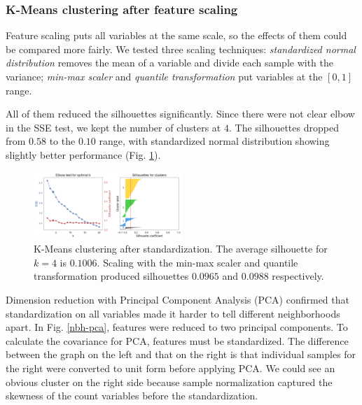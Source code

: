 \documentclass[compsoc]{IEEEtran}
\let\MYoriglatexcaption\caption
\renewcommand{\caption}[2][\relax]{\MYoriglatexcaption[#2]{#2}}
\begin{document}
\subsubsection{K-Means clustering after feature scaling}

Feature scaling puts all variables at the same scale, so the effects of them could be compared more fairly. We tested three scaling techniques: \textit{standardized normal distribution} removes the mean of a variable and divide each sample with the variance; \textit{min-max scaler} and \textit{quantile transformation} put variables at the $[0, 1]$ range.

All of them reduced the silhouettes significantly. Since there were not clear elbow in the SSE test, we kept the number of clusters at  $4$. The silhouettes dropped from $0.58$ to the $0.10$ range, with standardized normal distribution showing slightly better performance (Fig. \ref{nbh-kmeans-standardized}).

\begin{figure}[h]
  \hspace{-.5em}
    \includegraphics[width=0.5\textwidth]{nbh-kmeans-standardized}
  \caption{K-Means clustering after standardization. The average silhouette for $k = 4$ is $0.1006$. Scaling with the min-max scaler and quantile transformation produced silhouettes $0.0965$ and $0.0988$ respectively.}
  \label{nbh-kmeans-standardized}
\end{figure}

Dimension reduction with Principal Component Analysis (PCA) confirmed that standardization on all variables made it harder to tell different neighborhoods apart. In Fig. \ref{nbh-pca}, features were reduced to two principal components. To calculate the covariance for PCA, features must be standardized. The difference between the graph on the left and that on the right is that individual samples for the right were converted to unit form before applying PCA. We could see an obvious cluster on the right side because sample normalization captured the skewness of the count variables before the standardization.
\end{document}
